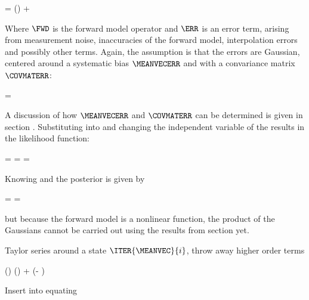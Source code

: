     \startformula
        \VECY = \FWD(\VECX) + \ERR
    \stopformula

    Where $\FWD$ is the forward model operator and $\ERR$ is an error term,
    arising from measurement noise, inaccuracies of the forward model,
    interpolation errors and possibly other terms. Again, the assumption is
    that the errors are Gaussian, centered around a systematic bias
    $\MEANVECERR$ and with a convariance matrix $\COVMATERR$:

    \startformula
        \PROB{\ERR} = \GAUSS{\ERR}{\MEANVECERR}{\COVMATERR}
    \stopformula

    A discussion of how $\MEANVECERR$ and $\COVMATERR$ can be determined is
    given in section . Substituting 
    into  and changing the independent variable of
    the {\PDF} results in the likelihood function:
    
    \placesubformula
    \startformula
    \startalign[n=3,align={right,middle,left}]
        \NC \PROB{\VECY - \FWD(\VECX)} = \NC
            \GAUSS{\VECY - \FWD(\VECX)}{\MEANVECERR}{\COVMATERR} \NC \NR
        \NC = \NC \GAUSS{\VECY}{\FWD(\VECX)+\MEANVECERR}{\COVMATERR} \NC
            = \LIKELIHOOD {}
    \stopalign
    \stopformula

    Knowing  and  the
    posterior {\PDF} is given by

    \startformula
        \POSTERIOR
        = \frac{\LIKELIHOOD \PRIOR}{\NORMALIZATION}
        = \frac{\GAUSS{\VECY}{\FWD(\VECX) + \MEANVECERR}{\COVMATERR}
            ~\GAUSS{\VECX}{\MEANVECA}{\COVMATA}}{\NORMALIZATION} \EQCOMMA
    \stopformula

    but because the forward model is a nonlinear function, the product of the
    Gaussians cannot be carried out using the results from section
     yet.

    \startsubsection[title=Iterative Solutions]

        Taylor series around a state $\ITER{\MEANVEC}{i}$, throw away higher
        order terms

        \startformula
            \FWD(\VECX) \approx \FWD()
                +  (\VECX - )
        \stopformula

        Insert into  equating

